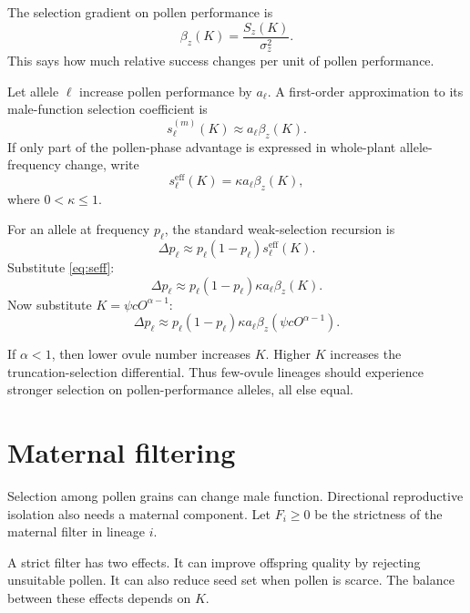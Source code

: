 \documentclass[12pt]{article}
\begin{document}
The selection gradient on pollen performance is
\begin{equation}
\beta_z(K)=\frac{S_z(K)}{\sigma_z^2}.
\label{eq:betaz}
\end{equation}
This says how much relative success changes per unit of pollen performance.

Let allele $\ell$ increase pollen performance by $a_\ell$. A first-order approximation to its male-function selection coefficient is
\begin{equation}
s_{\ell}^{(m)}(K)\approx a_\ell\beta_z(K).
\end{equation}
If only part of the pollen-phase advantage is expressed in whole-plant allele-frequency change, write
\begin{equation}
s_{\ell}^{\mathrm{eff}}(K)=\kappa a_\ell\beta_z(K),
\label{eq:seff}
\end{equation}
where $0<\kappa\leq 1$.

For an allele at frequency $p_\ell$, the standard weak-selection recursion is
\begin{equation}
\Delta p_\ell\approx p_\ell(1-p_\ell)s_{\ell}^{\mathrm{eff}}(K).
\label{eq:deltap}
\end{equation}
Substitute \eqref{eq:seff}:
\begin{equation}
\Delta p_\ell\approx p_\ell(1-p_\ell)\kappa a_\ell\beta_z(K).
\end{equation}
Now substitute $K=\psi cO^{\alpha-1}$:
\begin{equation}
\Delta p_\ell\approx p_\ell(1-p_\ell)\kappa a_\ell
\beta_z\left(\psi cO^{\alpha-1}\right).
\label{eq:deltapO}
\end{equation}

\begin{conclusionbox}
If $\alpha<1$, then lower ovule number increases $K$. Higher $K$ increases the truncation-selection differential. Thus few-ovule lineages should experience stronger selection on pollen-performance alleles, all else equal.
\end{conclusionbox}

\section{Maternal filtering}

Selection among pollen grains can change male function. Directional reproductive isolation also needs a maternal component. Let $F_i\geq 0$ be the strictness of the maternal filter in lineage $i$.

A strict filter has two effects. It can improve offspring quality by rejecting unsuitable pollen. It can also reduce seed set when pollen is scarce. The balance between these effects depends on $K$.
\end{document}
